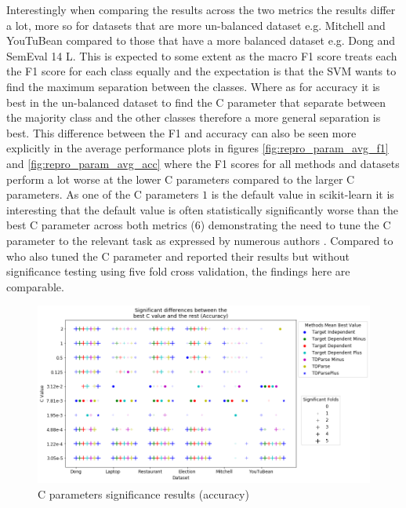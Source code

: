 Interestingly when comparing the results across the two metrics the results differ a lot, more so for datasets that are more un-balanced dataset e.g. Mitchell and YouTuBean compared to those that have a more balanced dataset e.g. Dong and SemEval 14 L. This is expected to some extent as the macro F1 score treats each the F1 score for each class equally and the expectation is that the SVM wants to find the maximum separation between the classes. Where as for accuracy it is best in the un-balanced dataset to find the C parameter that separate between the majority class and the other classes therefore a more general separation is best. This difference between the F1 and accuracy can also be seen more explicitly in the average performance plots in figures \ref{fig:repro_param_avg_f1} and \ref{fig:repro_param_avg_acc} where the F1 scores for all methods and datasets perform a lot worse at the lower C parameters compared to the larger C parameters. As one of the C parameters $1$ is the default value in scikit-learn it is interesting that the default value is often statistically significantly worse than the best C parameter across both metrics (6) demonstrating the need to tune the C parameter to the relevant task as expressed by numerous authors \citep{repro_fan_2008,repro_vo_2015,repro_wang_2017}. Compared to \citet{repro_vo_2015} who also tuned the C parameter and reported their results but without significance testing using five fold cross validation, the findings here are comparable.
\begin{figure}
    \centering
    \includegraphics[scale=0.55]{images/reproducibility/Parameters/C_Parameter/C_Sig_Plot_Accuracy.png}
    \caption{C parameters significance results (accuracy)}
    \label{fig:repro_param_c_sig_acc}
\end{figure}
